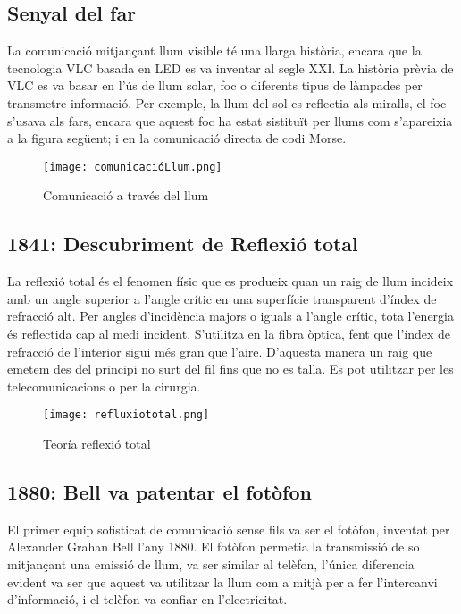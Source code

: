 \subsection*{Senyal del far}


La comunicació mitjançant llum visible té una llarga història, encara que la tecnologia VLC basada en LED es va inventar al segle XXI. La història prèvia de VLC es va basar en l'ús de llum solar, foc o diferents tipus de làmpades per transmetre informació. Per exemple, la llum del sol es reflectia als miralls, el foc s'usava als fars, encara que aquest foc ha estat sistituït per llums com s'apareixia a la figura següent; i en la comunicació directa de codi Morse.


\begin{figure}[h!]
    \centering
    \texttt{[image: comunicacióLlum.png]}
    \caption{Comunicació a través del llum}
\end{figure}


\subsection*{1841: Descubriment de Reflexió total}

La reflexió total és el fenomen físic que es produeix quan un raig de llum incideix amb un angle superior a l'angle crític en una superfície transparent d'índex de refracció alt. Per angles d'incidència majors o iguals a l'angle crític, tota l'energia és reflectida cap al medi incident.
S'utilitza en la fibra òptica, fent que l'índex de refracció de l'interior sigui més gran que l'aire. D'aquesta manera un raig que emetem des del principi no surt del fil fins que no es talla. Es pot utilitzar per les telecomunicacions o per la cirurgia.

\begin{figure}[h!]
    \centering
    \texttt{[image: refluxiototal.png]}
    \caption{Teoría reflexió total}
\end{figure}


\subsection*{1880: Bell va patentar el fotòfon}

El primer equip sofisticat de comunicació sense fils va ser el fotòfon, inventat per Alexander Grahan Bell l'any 1880.
El fotòfon permetia la transmissió de so mitjançant una emissió de llum, va ser similar al telèfon, l'única diferencia evident va ser que aquest va utilitzar la llum com a mitjà per a fer l'intercanvi d'informació, i el telèfon va confiar en l'electricitat.

